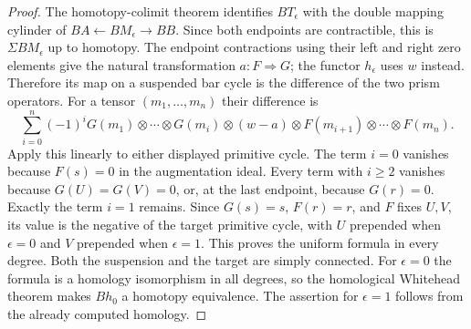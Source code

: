 \begin{proof}
The homotopy-colimit theorem identifies $BT_\epsilon$ with the
double mapping cylinder of $BA\leftarrow BM_\epsilon\to BB$.
Since both endpoints are contractible, this is
$\Sigma BM_\epsilon$ up to homotopy.  The endpoint contractions
using their left and right zero elements give the natural
transformation $a:F\Rightarrow G$; the functor $h_\epsilon$
uses $w$ instead.  Therefore its map on a suspended bar cycle
is the difference of the two prism operators.
For a tensor $(m_1,\ldots,m_n)$ their difference is
\[
 \sum_{i=0}^n(-1)^i
 G(m_1)\otimes\cdots\otimes G(m_i)\otimes(w-a)
 \otimes F(m_{i+1})\otimes\cdots\otimes F(m_n).
\]
Apply this linearly to either displayed primitive cycle.
The term $i=0$ vanishes because $F(s)=0$ in the augmentation
ideal.  Every term with $i\geq2$ vanishes because $G(U)=G(V)=0$,
or, at the last endpoint, because $G(r)=0$.
Exactly the term $i=1$ remains.  Since $G(s)=s$, $F(r)=r$,
and $F$ fixes $U,V$, its value is the negative of the target
primitive cycle, with $U$ prepended when $\epsilon=0$ and $V$
prepended when $\epsilon=1$.  This proves the uniform formula
in every degree.  Both the suspension and the target are simply
connected.  For $\epsilon=0$ the formula is a homology
isomorphism in all degrees, so the homological Whitehead theorem
makes $Bh_0$ a homotopy equivalence.  The assertion for
$\epsilon=1$ follows from the already computed homology.
\end{proof}

